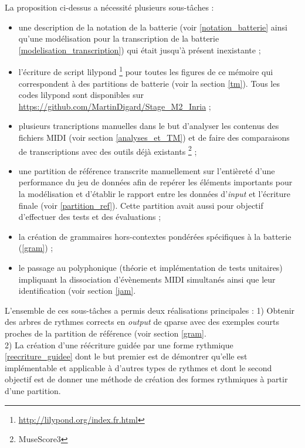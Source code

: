 La proposition ci-dessus a nécessité plusieurs sous-tâches :
\begin{itemize}
    \item une description de la notation de la batterie (voir
        \ref{notation_batterie} ainsi qu’une modélisation pour la transcription
        de la batterie \ref{modelisation_transcription}) qui était jusqu’à
        présent inexistante ;
    \item l’écriture de script lilypond \footnote{
        \url{http://lilypond.org/index.fr.html}} pour toutes les figures de ce
        mémoire qui correspondent à des partitions de batterie (voir la section
        \ref{tm}). Tous les codes lilypond sont disponibles sur \url{
        https://github.com/MartinDigard/Stage_M2_Inria} ;
    \item plusieurs trancriptions manuelles dans le but d’analyser les contenus
        des fichiers MIDI (voir section \ref{analyses_et_TM}) et de faire des
        comparaisons de transcriptions avec des outils déjà existants
        \footnote{MuseScore3} ;
    \item une partition de référence transcrite manuellement sur l’entièreté
        d’une performance du jeu de données afin de repérer les éléments
        importants pour la modélisation et d’établir le rapport entre les
        données d’\textit{input} et l’écriture finale (voir
        \ref{partition_ref}). Cette partition avait aussi pour objectif
        d’effectuer des tests et des évaluations ;
    \item  la création de grammaires hors-contextes pondérées spécifiques à
        la batterie (\ref{gram}) ;
    \item le passage au polyphonique (théorie et implémentation de tests
        unitaires) impliquant la dissociation d’évènements MIDI simultanés
        ainsi que leur identification (voir section \ref{jam}. 
\end{itemize}

L’ensemble de ces sous-tâches a permis deux réalisations principales :
1) Obtenir des arbres de rythmes corrects en \textit{output} de qparse avec des
exemples courts proches de la partition de référence (voir section
\ref{gram}.\\
2) La création d’une réécriture guidée par une forme rythmique
\ref{reecriture_guidee} dont le but premier est de démontrer qu’elle est
implémentable et applicable à d’autres types de rythmes et dont le second
objectif est de donner une méthode de création des formes rythmiques à partir
d’une partition.\\

